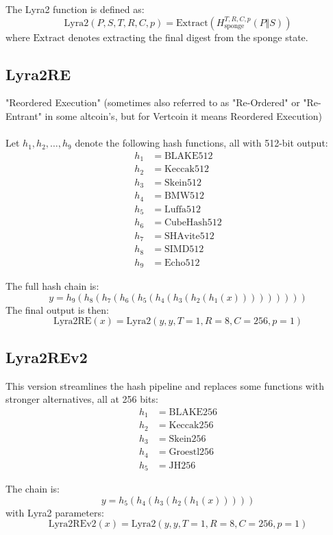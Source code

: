 \documentclass[12pt]{article}
\begin{document}
The Lyra2 function is defined as:
\[
\mathrm{Lyra2}(P, S, T, R, C, p) = \mathrm{Extract}(H_{\text{sponge}}^{T,R,C,p}(P \Vert S))
\]
where $\mathrm{Extract}$ denotes extracting the final digest from the sponge state.

\subsection{Lyra2RE}
"Reordered Execution" (sometimes also referred to as "Re-Ordered" or "Re-Entrant" in some altcoin's, but for Vertcoin it means Reordered Execution)
\\
\\
Let $h_1, h_2, \ldots, h_9$ denote the following hash functions, all with 512-bit output:
\begin{align*}
h_1 &= \mathrm{BLAKE512} \\
h_2 &= \mathrm{Keccak512} \\
h_3 &= \mathrm{Skein512} \\
h_4 &= \mathrm{BMW512} \\
h_5 &= \mathrm{Luffa512} \\
h_6 &= \mathrm{CubeHash512} \\
h_7 &= \mathrm{SHAvite512} \\
h_8 &= \mathrm{SIMD512} \\
h_9 &= \mathrm{Echo512}
\end{align*}

The full hash chain is:
\[
y = h_9(h_8(h_7(h_6(h_5(h_4(h_3(h_2(h_1(x)))))))))
\]
The final output is then:
\[
\mathrm{Lyra2RE}(x) = \mathrm{Lyra2}(y, y, T=1, R=8, C=256, p=1)
\]

\subsection{Lyra2REv2}

This version streamlines the hash pipeline and replaces some functions with stronger alternatives, all at 256 bits:
\begin{align*}
h_1 &= \mathrm{BLAKE256} \\
h_2 &= \mathrm{Keccak256} \\
h_3 &= \mathrm{Skein256} \\
h_4 &= \mathrm{Groestl256} \\
h_5 &= \mathrm{JH256}
\end{align*}

The chain is:
\[
y = h_5(h_4(h_3(h_2(h_1(x)))))
\]
with Lyra2 parameters:
\[
\mathrm{Lyra2REv2}(x) = \mathrm{Lyra2}(y, y, T=1, R=8, C=256, p=1)
\]
\end{document}
